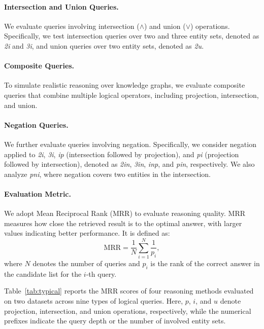 \documentclass[11pt]{article}
\begin{document}
\paragraph{Intersection and Union Queries.}
We evaluate queries involving intersection ($\wedge$) and union ($\vee$) operations.
Specifically, we test intersection queries over two and three entity sets, denoted as \textit{2i} and \textit{3i}, and union queries over two entity sets, denoted as \textit{2u}.

\paragraph{Composite Queries.}
To simulate realistic reasoning over knowledge graphs, we evaluate composite queries that combine multiple logical operators, including projection, intersection, and union.

\paragraph{Negation Queries.}
We further evaluate queries involving negation.
Specifically, we consider negation applied to \textit{2i}, \textit{3i}, \textit{ip} (intersection followed by projection), and \textit{pi} (projection followed by intersection), denoted as \textit{2in}, \textit{3in}, \textit{inp}, and \textit{pin}, respectively.
We also analyze \textit{pni}, where negation covers two entities in the intersection.

\paragraph{Evaluation Metric.}
We adopt Mean Reciprocal Rank (MRR) to evaluate reasoning quality.
MRR measures how close the retrieved result is to the optimal answer, with larger values indicating better performance.
It is defined as:
\begin{equation}
\mathrm{MRR} = \frac{1}{N} \sum_{i=1}^{N} \frac{1}{p_i},
\end{equation}
where $N$ denotes the number of queries and $p_i$ is the rank of the correct answer in the candidate list for the $i$-th query.

Table~\ref{tab:typical} reports the MRR scores of four reasoning methods evaluated on two datasets across nine types of logical queries.
Here, $p$, $i$, and $u$ denote projection, intersection, and union operations, respectively, while the numerical prefixes indicate the query depth or the number of involved entity sets.
\end{document}
